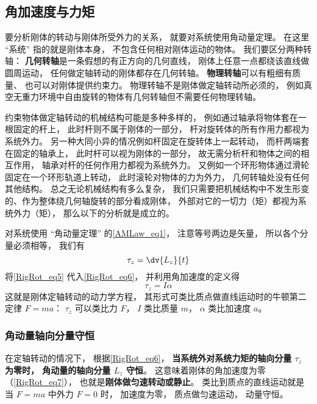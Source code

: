 \subsection{角加速度与力矩}
要分析刚体的转动与刚体所受外力的关系， 就要对系统使用角动量定理。 在这里 “系统” 指的就是刚体本身， 不包含任何相对刚体运动的物体。 我们要区分两种转轴： \textbf{几何转轴}是一条假想的有正方向的几何直线， 刚体上任意一点都绕该直线做圆周运动， 任何做定轴转动的刚体都存在几何转轴。 \textbf{物理转轴}可以有粗细有质量、 也可以对刚体提供约束力。 物理转轴不是刚体做定轴转动所必须的， 例如真空无重力环境中自由旋转的物体有几何转轴但不需要任何物理转轴。

约束物体做定轴转动的机械结构可能是多种多样的， 例如通过轴承将物体套在一根固定的杆上， 此时杆则不属于刚体的一部分， 杆对旋转体的所有作用力都视为系统外力。 另一种大同小异的情况例如杆固定在旋转体上一起转动， 而杆两端套在固定的轴承上， 此时杆可以视为刚体的一部分， 故无需分析杆和物体之间的相互作用， 轴承对杆的任何作用力都视为系统外力。 又例如一个环形物体通过滑轮固定在一个环形轨道上转动， 此时滚轮对物体的力为外力， 几何转轴处没有任何其他结构。 总之无论机械结构有多么复杂， 我们只需要把机械结构中不发生形变的、作为整体绕几何轴旋转的部分看成刚体， 外部对它的一切力（矩）都视为系统外力（矩）， 那么以下的分析就是成立的。

对系统使用 “角动量定理” 的\autoref{AMLaw_eq1}， 注意等号两边是矢量， 所以各个分量必须相等， 我们有
\begin{equation}\label{RigRot_eq6}
\tau_z = \dv{L_z}{t}
\end{equation}
将\autoref{RigRot_eq5} 代入\autoref{RigRot_eq6}， 并利用角加速度的定义得
\begin{equation}\label{RigRot_eq7}
\tau_z = I\alpha
\end{equation}
这就是刚体定轴转动的动力学方程， 其形式可类比质点做直线运动时的牛顿第二定律 $F = ma$： $\tau_z$ 可以类比力 $F$， $I$ 类比质量 $m$， $\alpha$ 类比加速度 $a$。

\subsubsection{角动量轴向分量守恒}
在定轴转动的情况下， 根据\autoref{RigRot_eq6}， \textbf{当系统外对系统力矩的轴向分量 $\tau_z$ 为零时， 角动量的轴向分量 $L_z$ 守恒}。  这意味着刚体的角加速度为零（\autoref{RigRot_eq7}）， 也就是\textbf{刚体做匀速转动或静止}。 类比到质点的直线运动就是当 $F = ma$ 中外力 $F = 0$ 时， 加速度为零， 质点做匀速运动， 动量守恒。

